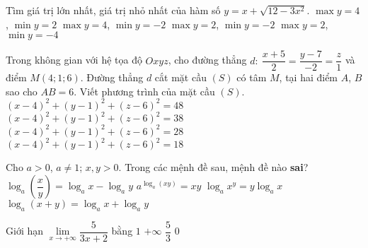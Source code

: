\begin{ex}%
Tìm giá trị lớn nhất, giá trị nhỏ nhất của hàm số $y=x+\sqrt{12-3x^2}$.
\choice
{$\max y=4$, $\min y=2$}
{\True $\max y=4$, $\min y=-2$}
{$\max y=2$, $\min y=-2$}
{$\max y=2$, $\min y=-4$}
\end{ex}

\begin{ex}%
Trong không gian với hệ tọa độ $Oxyz$, cho đường thẳng $d:\ \dfrac{x+5}{2}=\dfrac{y-7}{-2}=\dfrac{z}{1}$ và điểm $M(4;1;6)$. Đường thẳng $d$ cắt mặt cầu $(S)$ có tâm $M$, tại hai điểm $A$, $B$ sao cho $AB=6$. Viết phương trình của mặt cầu $(S)$.
\choice
{$(x-4)^2+(y-1)^2+(z-6)^2=48$}
{$(x-4)^2+(y-1)^2+(z-6)^2=38$}
{$(x-4)^2+(y-1)^2+(z-6)^2=28$}
{\True $(x-4)^2+(y-1)^2+(z-6)^2=18$}
\end{ex}

\begin{ex}%
Cho $a>0$, $a\ne 1$; $x,y>0$. Trong các mệnh đề sau, mệnh đề nào \textbf{sai}?
\choice
{$\log_a\left(\dfrac{x}{y}\right)=\log_a x-\log_a y$}
{$a^{\log_a(xy)}=xy$}
{$\log_a x^y=y\log_a x$}
{\True $\log_a(x+y)=\log_a x+\log_a y$}
\end{ex}

\begin{ex}%
Giới hạn $\lim\limits_{x\to +\infty} \dfrac{5}{3x+2}$ bằng
\choice
{$1$}
{$+\infty$}
{$\dfrac{5}{3}$}
{\True $0$}
\end{ex}

